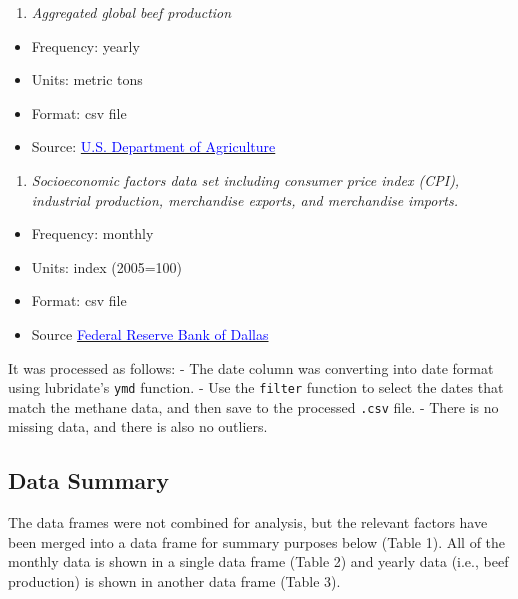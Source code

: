 \documentclass[
]{article}
\providecommand{\tightlist}{%
  \setlength{\itemsep}{0pt}\setlength{\parskip}{0pt}}
\begin{document}
\begin{enumerate}
\def\labelenumi{\arabic{enumi}.}
\setcounter{enumi}{2}
\tightlist
\item
  \emph{Aggregated global beef production}
\end{enumerate}

\begin{itemize}
\tightlist
\item
  Frequency: yearly
\item
  Units: metric tons
\item
  Format: csv file
\item
  Source:
  \href{https://www.fas.usda.gov/data/production/commodity/0111000}{\textcolor{blue}{U.S. Department of Agriculture}}
\end{itemize}

\begin{enumerate}
\def\labelenumi{\arabic{enumi}.}
\setcounter{enumi}{3}
\tightlist
\item
  \emph{Socioeconomic factors data set including consumer price index
  (CPI), industrial production, merchandise exports, and merchandise
  imports.}
\end{enumerate}

\begin{itemize}
\tightlist
\item
  Frequency: monthly
\item
  Units: index (2005=100)
\item
  Format: csv file
\item
  Source
  \href{https://www.dallasfed.org/research/econdata#international}{\textcolor{blue}{Federal Reserve Bank of Dallas}}
\end{itemize}

It was processed as follows: - The date column was converting into date
format using lubridate's \texttt{ymd} function. - Use the
\texttt{filter} function to select the dates that match the methane
data, and then save to the processed \texttt{.csv} file. - There is no
missing data, and there is also no outliers.

\subsection{Data Summary}\label{data-summary}

The data frames were not combined for analysis, but the relevant factors
have been merged into a data frame for summary purposes below (Table 1).
All of the monthly data is shown in a single data frame (Table 2) and
yearly data (i.e., beef production) is shown in another data frame
(Table 3).
\end{document}
